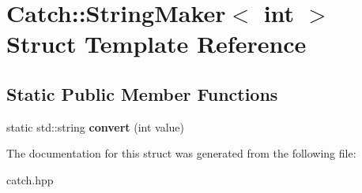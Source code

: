 \hypertarget{structCatch_1_1StringMaker_3_01int_01_4}{}\section{Catch\+:\+:String\+Maker$<$ int $>$ Struct Template Reference}
\label{structCatch_1_1StringMaker_3_01int_01_4}
\subsection*{Static Public Member Functions}
\begin{DoxyCompactItemize}
\item 
static std\+::string {\bfseries convert} (int value)\hypertarget{structCatch_1_1StringMaker_3_01int_01_4_aab096e55fb7283f6ad47b5ca277e22e8}{}\label{structCatch_1_1StringMaker_3_01int_01_4_aab096e55fb7283f6ad47b5ca277e22e8}

\end{DoxyCompactItemize}


The documentation for this struct was generated from the following file\+:\begin{DoxyCompactItemize}
\item 
catch.\+hpp\end{DoxyCompactItemize}
